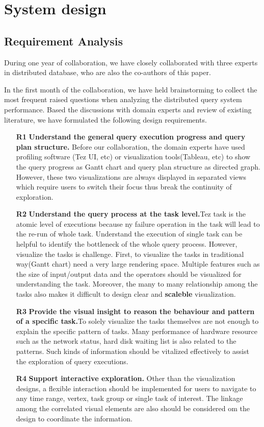 \section{System design}\label{sec:systemdesign}


\subsection{Requirement Analysis}
During one year of collaboration, we have closely collaborated with three experts in distributed database, who are also the co-authors of this paper.

In the first month of the collaboration, we have held brainstorming to collect the most frequent raised questions when analyzing the distributed query system performance. Based the discussions with domain experts and review of existing literature, we have formulated the following design requirements.

\begin{itemize}
  \item[\textbf{R1}]\textbf{Understand the general query execution progress and query plan structure.} Before our collaboration, the domain experts have used profiling software (Tez  UI, etc) or visualization tools(Tableau, etc) to show the query progress as Gantt chart and query plan structure as directed graph. However, these two visualizations are always displayed in separated views which require users to switch their focus thus break the continuity of exploration.
  \item[\textbf{R2}]\textbf{Understand the query process at the task level.}Tez task is the atomic level of executions because ny failure operation in the task will lead to the re-run of whole task. Understand the execution of single task can be helpful to identify the bottleneck of the whole query process. However, visualize the tasks is challenge. First, to visualize the tasks in traditional way(Gantt chart) need a very large rendering space. Multiple features such as the size of input/output data and the operators should be visualized for understanding the task. Moreover, the many to many relationship among the tasks also makes it difficult to design clear and \textbf{scaleble} visualization.
  \item[\textbf{R3}]\textbf{Provide the visual insight to reason the behaviour and pattern of a specific task.}To solely visualize the tasks themselves are not enough to explain the specific pattern of tasks. Many performance of hardware resource such as the network status, hard disk waiting list is also related to the patterns. Such kinds of information should be vitalized effectively to assist the exploration of query executions. 
  \item[\textbf{R4}]\textbf{ Support interactive exploration.} Other than the visualization designs, a flexible interaction should be implemented for users to navigate to any time range, vertex, task group or single task of interest. The linkage among the correlated visual elements are also should be considered om the design to coordinate the information.

\end{itemize}

